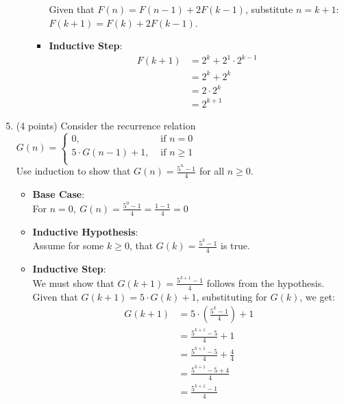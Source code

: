 \documentclass{article}
\begin{document}
\begin{enumerate}
\begin{enumerate}
\begin{itemize}
            Given that $F(n) = F(n -1) + 2F(k - 1)$, substitute $n = k + 1$: $F(k + 1) = F(k) + 2F(k - 1)$. \\
            \item \textbf{Inductive Step}:
            \begin{align*}
                F(k + 1) &= 2^k + 2^1 \cdot 2^{k-1} \\
                &= 2^k + 2^k \\
                &= 2 \cdot 2^k \\
                &= 2^{k+1}
            \end{align*}
        \end{itemize}
    \end{enumerate}
\end{enumerate}

\newpage

\begin{enumerate}
    \setcounter{enumi}{4}
    \item (4 points) Consider the recurrence relation $G(n) = \begin{cases}
        0, &\text{ if } n = 0 \\
        5\cdot G(n-1) + 1, &\text { if } n \geq 1 \\
    \end{cases}$ \\
    Use induction to show that $G(n) = \displaystyle \frac{5^n - 1}{4}$ for all $n \geq 0$.

    \begin{itemize}
        \item \textbf{Base Case}: \\
            For $n = 0, \ G(n) = \displaystyle \frac{5^0 - 1}{4} = \displaystyle \frac{1-1}{4} = 0$ \\
        \item \textbf{Inductive Hypothesis}: \\
            Assume for some $k \geq 0$, that $G(k) = \displaystyle \frac{5^k - 1}{4}$ is true. \\
        \item \textbf{Inductive Step}: \\
        We must show that $G(k+1) = \frac{5^{k+1} - 1}{4}$ follows from the hypothesis. Given that $G(k +1) = 5\cdot G(k) + 1$, substituting for $G(k)$, we get:
        \begin{align*}
            G(k +1) &= 5 \displaystyle \cdot (\frac{5^k - 1}{4}) + 1 \\
            &= \displaystyle \frac{5^{k+1} - 5}{4} + 1 \\
            &= \displaystyle \frac{5^{k+1} - 5}{4} + \displaystyle \frac{4}{4} \\
            &= \displaystyle \frac{5^{k+1} - 5 + 4}{4} \\
            &= \displaystyle \frac{5^{k+1} - 1}{4}
        \end{align*}
    \end{itemize}
\end{enumerate}
\end{document}
